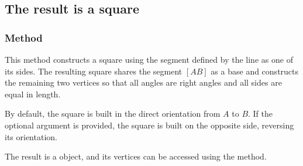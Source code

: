\vspace{1em}

\begin{tkzexample}[latex=.5\textwidth]
\begin{center}
\end{center}
\end{tkzexample}

\subsection{The result is a square}


\subsubsection{Method }
\label{ssub:method_line_square}

This method constructs a square using the segment defined by the line as one of its sides. The resulting square shares the segment $[AB]$ as a base and constructs the remaining two vertices so that all angles are right angles and all sides are equal in length.

\medskip
\noindent
By default, the square is built in the direct orientation from $A$ to $B$. If the optional argument  is provided, the square is built on the opposite side, reversing its orientation.

\medskip
\noindent
The result is a  object, and its vertices can be accessed using the  method.

\vspace{1em}

\begin{tkzexample}[latex=.5\textwidth]

\end{tkzexample}

